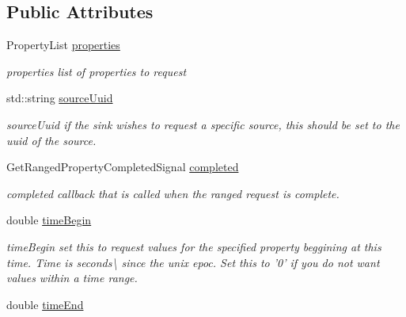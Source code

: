 \subsection*{Public Attributes}
\begin{DoxyCompactItemize}
\item 
\hypertarget{classAsyncRangePropertyRequest_afd6f95a06376fef905faf5ab1b580bc9}{Property\-List \hyperlink{classAsyncRangePropertyRequest_afd6f95a06376fef905faf5ab1b580bc9}{properties}}\label{classAsyncRangePropertyRequest_afd6f95a06376fef905faf5ab1b580bc9}

\begin{DoxyCompactList}\small\item\em properties list of properties to request \end{DoxyCompactList}\item 
\hypertarget{classAsyncRangePropertyRequest_a626258d5d401e0598d619b84600689f9}{std\-::string \hyperlink{classAsyncRangePropertyRequest_a626258d5d401e0598d619b84600689f9}{source\-Uuid}}\label{classAsyncRangePropertyRequest_a626258d5d401e0598d619b84600689f9}

\begin{DoxyCompactList}\small\item\em source\-Uuid if the sink wishes to request a specific source, this should be set to the uuid of the source. \end{DoxyCompactList}\item 
\hypertarget{classAsyncRangePropertyRequest_a81777a8e0304bd6929c05d39c650454d}{Get\-Ranged\-Property\-Completed\-Signal \hyperlink{classAsyncRangePropertyRequest_a81777a8e0304bd6929c05d39c650454d}{completed}}\label{classAsyncRangePropertyRequest_a81777a8e0304bd6929c05d39c650454d}

\begin{DoxyCompactList}\small\item\em completed callback that is called when the ranged request is complete. \end{DoxyCompactList}\item 
\hypertarget{classAsyncRangePropertyRequest_a2dc2927f6c771707f15a767358a58e69}{double \hyperlink{classAsyncRangePropertyRequest_a2dc2927f6c771707f15a767358a58e69}{time\-Begin}}\label{classAsyncRangePropertyRequest_a2dc2927f6c771707f15a767358a58e69}

\begin{DoxyCompactList}\small\item\em time\-Begin set this to request values for the specified property beggining at this time. Time is seconds\textbackslash{} since the unix epoc. Set this to '0' if you do not want values within a time range. \end{DoxyCompactList}\item 
\hypertarget{classAsyncRangePropertyRequest_acd2a28137c227b0fb6a51576d84f5f30}{double \hyperlink{classAsyncRangePropertyRequest_acd2a28137c227b0fb6a51576d84f5f30}{time\-End}}\label{classAsyncRangePropertyRequest_acd2a28137c227b0fb6a51576d84f5f30}


\end{DoxyCompactItemize}
